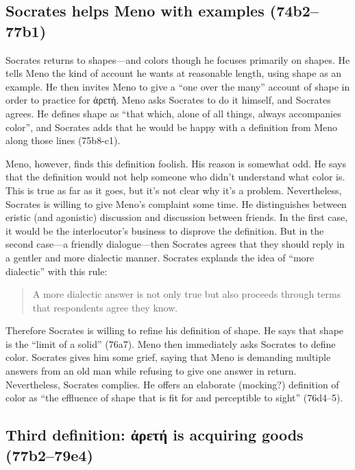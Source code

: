 \documentclass[12pt,letterpaper]{article}
\begin{document}
\subsection*{Socrates helps Meno with examples (74b2--77b1)}

Socrates returns to shapes---and colors though he focuses primarily on shapes. He tells Meno the kind of account he wants at reasonable length, using shape as an example. He then invites Meno to give a ``one over the many'' account of shape in order to practice for \textgreek{ἀρετή}. Meno asks Socrates to do it himself, and Socrates agrees. He defines shape as ``that which, alone of all things, always accompanies color'', and Socrates adds that he would be happy with a definition from Meno along those lines (75b8-c1).

Meno, however, finds this definition foolish. His reason is somewhat odd. He says that the definition would not help someone who didn't understand what color is. This is true as far as it goes, but it's not clear why it's a problem. Nevertheless, Socrates is willing to give Meno's complaint some time. He distinguishes between eristic (and agonistic) discussion and discussion between friends. In the first case, it would be the interlocutor's business to disprove the definition. But in the second case---a friendly dialogue---then Socrates agrees that they should reply in a gentler and more dialectic manner. Socrates explands the idea of ``more dialectic'' with this rule:

\begin{quote}
    A more dialectic answer is not only true but also proceeds through terms that respondents agree they know.
\end{quote}

Therefore Socrates is willing to refine his definition of shape. He says that shape is the ``limit of a solid'' (76a7). Meno then immediately asks Socrates to define color. Socrates gives him some grief, saying that Meno is demanding multiple answers from an old man while refusing to give one answer in return. Nevertheless, Socrates complies. He offers an elaborate (mocking?) definition of color as ``the effluence of shape that is fit for and perceptible to sight'' (76d4--5).

\subsection*{Third definition: \textgreek{ἀρετή} is acquiring goods (77b2--79e4)}
\end{document}
